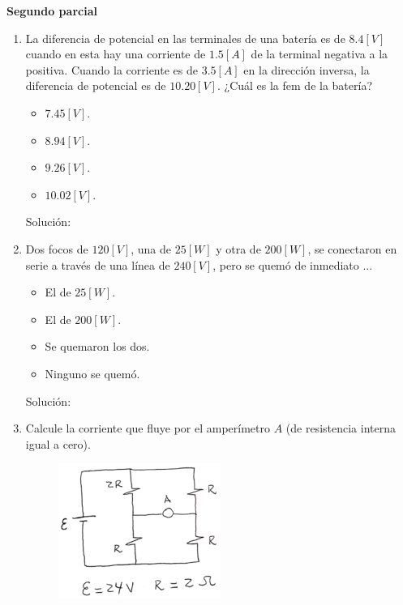 \documentclass[letter,11pt]{article}
\begin{document}
\begin{center}
    {\Large \bf{Segundo parcial}}
\end{center}

\noindent{}

\vspace{0.5cm}

\begin{enumerate}
\item La diferencia de potencial en las terminales de una batería es de
$8.4 [V]$ cuando en esta hay una corriente de $1.5 [A]$ de la terminal negativa
a la positiva. Cuando la corriente es de $3.5 [A]$ en la dirección inversa, la
diferencia de potencial es de $10.20 [V]$. ¿Cuál es la fem de la batería?

\begin{itemize}
    \item $ 7.45 [V]$.
    \item $ 8.94 [V]$.
    \item $ 9.26 [V]$.
    \item $10.02 [V]$.
\end{itemize}

Solución: \\

\item Dos focos de $120 [V]$, una de $25 [W]$ y otra de $200 [W]$, se conectaron
en serie a través de una línea de $240 [V]$, pero se quemó de inmediato ...

\begin{itemize}
    \item El de $25 [W]$.
    \item El de $200 [W]$.
    \item Se quemaron los dos.
    \item Ninguno se quemó.
\end{itemize}

Solución: \\

\item Calcule la corriente que fluye por el amperímetro $A$ (de resistencia
interna igual a cero).

\begin{figure}[!h]
\centering
\includegraphics[scale=2.00]{resources/q3.eps}
\end{figure}


\end{enumerate}
\end{document}
